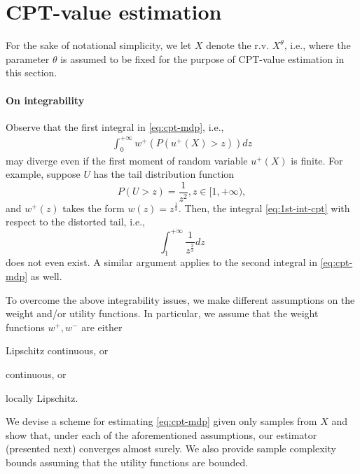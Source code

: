 \documentclass[11pt,letterpaper,english]{article}
\begin{document}

\section{CPT-value estimation} 
\label{sec:cpt-sampling}

For the sake of notational simplicity, we let $X$ denote the r.v. $X^\theta$, i.e., where the parameter $\theta$ is assumed to be fixed for the purpose of CPT-value estimation in this section. 

\paragraph{On integrability}
Observe that the first integral in \eqref{eq:cpt-mdp}, i.e., 
\begin{align}
\label{eq:1st-int-cpt}
\int_0^{+\infty} w^+(P(u^+(X)>z)) d z
\end{align}
may diverge even if the first moment of random variable $u^+(X)$ is finite. 
For example, suppose $U$ has the tail distribution function
$$P(U>z)  = \frac{1}{z^2}, z\in [1, +\infty),$$
and $w^+(z)$ takes the form $w(z) = z^{\frac{1}{3}}$. Then, the integral \eqref{eq:1st-int-cpt} with respect to the distorted tail, i.e.,
$$
\int_1^{+\infty} \frac{1}{z^{\frac{2}{3}}} dz
$$
does not even exist. A similar argument applies to the second integral in \eqref{eq:cpt-mdp} as well.

To overcome the above integrability issues, we make different assumptions on the weight and/or utility functions. In particular, we assume that the weight functions $w^+, w^-$ are either 
\begin{inparaenum}[\bfseries (i)]
\item Lipschitz continuous, or
\item \holder continuous, or
\item locally Lipschitz.
\end{inparaenum}
We devise a scheme for estimating \eqref{eq:cpt-mdp} given only samples from $X$ and show that, under each of the aforementioned assumptions, our estimator (presented next) converges almost surely. 
We also provide sample complexity bounds assuming that the utility functions are bounded.
\end{document}
